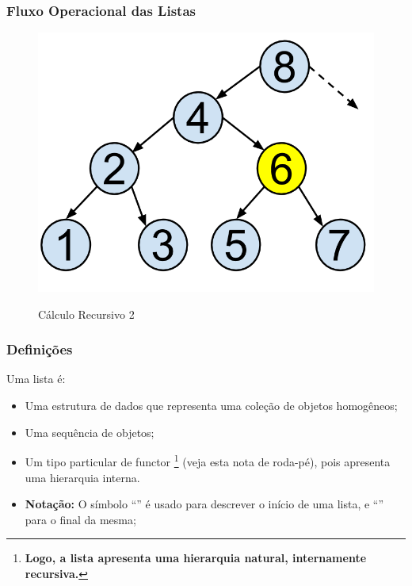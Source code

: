 \documentclass[sans]{beamer}
\begin{document}
\begin{frame}
\frametitle{Fluxo Operacional das Listas}

\begin{figure}[!htb]
\centering
\includegraphics[scale = 0.25]{figuras/FluxoOperacional.png}
\label{fig_arv_recurs_2}
\caption{Cálculo Recursivo 2}
\end{figure}


\end{frame}


\begin{frame}
\frametitle{Definições}
\begin{block}{Uma lista é:}
\begin{itemize}

\item Uma estrutura de dados que representa uma coleção de objetos homogêneos;
\item Uma sequência de objetos;
\item Um  tipo particular de functor
\footnote{{\bf Logo, a lista apresenta uma hierarquia natural, 
internamente recursiva.}} (veja esta nota de roda-pé), 
pois apresenta uma hierarquia interna.
\item {\bf Notação:} O símbolo ``\lbrack'' é usado para descrever o início de uma lista,
e ``\rbrack'' para o final da mesma;

\end{itemize}
\end{block}   
\end{frame}
\end{document}
